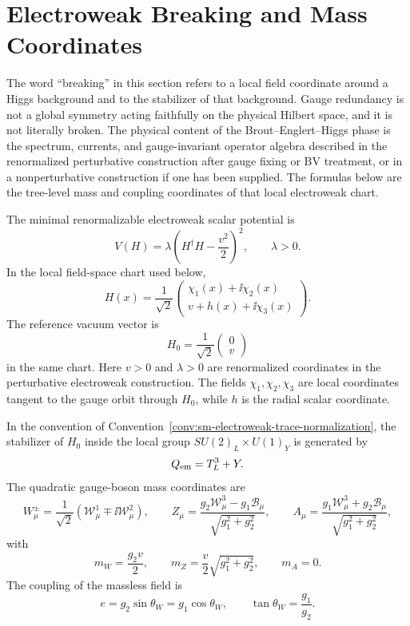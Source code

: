 \section{Electroweak Breaking and Mass Coordinates}

The word ``breaking'' in this section refers to a local field coordinate
around a Higgs background and to the stabilizer of that background.  Gauge
redundancy is not a global symmetry acting faithfully on the physical Hilbert
space, and it is not literally broken.  The physical content of the
Brout--Englert--Higgs phase is the spectrum, currents, and gauge-invariant
operator algebra described in the renormalized perturbative construction
after gauge fixing or BV treatment, or in a nonperturbative construction if
one has been supplied.  The formulas below are the tree-level mass and
coupling coordinates of that local electroweak chart.

\begin{definition}
\label{def:sm-electroweak-scalar-chart}
The minimal renormalizable electroweak scalar potential is
\[
  V(H)=\lambda\left(H^\dagger H-\frac{v^2}{2}\right)^2 ,
  \qquad \lambda>0 .
\]
In the local field-space chart used below,
\[
  H(x)=\frac1{\sqrt2}
  \begin{pmatrix}
    \chi_1(x)+\ii\chi_2(x)\\
    v+h(x)+\ii\chi_3(x)
  \end{pmatrix}.
\]
The reference vacuum vector is
\[
  H_0=\frac1{\sqrt2}\begin{pmatrix}0\\ v\end{pmatrix}
\]
in the same chart.  Here \(v>0\) and \(\lambda>0\) are renormalized
coordinates in the perturbative electroweak construction.  The fields
\(\chi_1,\chi_2,\chi_3\) are local coordinates tangent to the gauge orbit
through \(H_0\), while \(h\) is the radial scalar coordinate.
\end{definition}

\begin{proposition}
\label{prop:sm-electroweak-stabilizer-masses}
In the convention of
Convention~\ref{conv:sm-electroweak-trace-normalization}, the stabilizer of
\(H_0\) inside the local group \(SU(2)_L\times U(1)_Y\) is generated by
\[
  Q_{\rm em}=T^3_L+Y .
\]
The quadratic gauge-boson mass coordinates are
\[
  W^\pm_\mu=\frac1{\sqrt2}(\mathcal W^1_\mu\mp\ii\mathcal W^2_\mu),
  \qquad
  Z_\mu=\frac{g_2\mathcal W^3_\mu-g_1\mathcal B_\mu}
              {\sqrt{g_1^2+g_2^2}},
  \qquad
  A_\mu=\frac{g_1\mathcal W^3_\mu+g_2\mathcal B_\mu}
              {\sqrt{g_1^2+g_2^2}},
\]
with
\[
  m_W=\frac{g_2v}{2},
  \qquad
  m_Z=\frac{v}{2}\sqrt{g_1^2+g_2^2},
  \qquad
  m_A=0 .
\]
The coupling of the massless field is
\[
  e=g_2\sin\theta_W=g_1\cos\theta_W,
  \qquad
  \tan\theta_W=\frac{g_1}{g_2}.
\]
\end{proposition}

